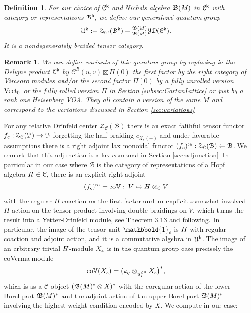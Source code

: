 \documentclass[a4paper, reqno]{amsart}
\newtheorem{definition}[theorem]{Definition}
\newtheorem{remark}[theorem]{Remark}
\theoremstyle{introTheorems}
\newcommand\cB{\mathcal{B}}
\newcommand\cC{\mathcal{C}}
\newcommand\cU{\mathcal{U}}
\newcommand\cZ{\mathcal{Z}}
\newcommand{\Vect}{\textup{Vect}}
\renewcommand{\1}{\mathbbold{1}}
\begin{document}
\begin{definition}
For our choice of $\cC^\k$ and Nichols algebra $\mathfrak{B}(M)$ in $\cC^\k$ with category or representations $\cB^\k$, we define our \emph{generalized quantum group}
\[\cU^\k:=\cZ_{\cC^\k}(\cB^\k)=\YD{\NicholsOf(M)}(\cC^\k).\]
It  is a nondegenerately braided tensor category.
\end{definition}
\begin{remark}
We can define variants of this quantum group by replacing in the Deligne product $\cC^\k$  by $\cC^R(u,v)\boxtimes \Pi(0)$ the first factor by the right category of Virasoro modules and/or the second factor $\Pi(0)$ by a fully unrolled version $\Vect_\h$ or the fully rolled version $\Pi$ in Section \ref{subsec:CartanLattice} or just by a rank one Heisenberg VOA. They all contain a version of the same $M$  and correspond to the variations discussed in Section \ref{sec:variations}
\end{remark}

For any relative Drinfeld center $\cZ_\cC(\cB)$ there is an exact faithful tensor functor $\forget_c:\cZ_\cC(\cB)\to \cB$ forgetting the half-braiding $c_{X,(-)}$ and under favorable assumptions there is a right adjoint lax monoidal functor $(\forget_c)^\ra:\cZ_\cC(\cB)\leftarrow \cB$. We remark that this adjunction is a lax comonad in Section \ref{sec:adjunction}. In particular in our case where $\cB$ is the category of representations of a Hopf algebra $\Nichols\in \cC$,  there is an explicit right adjoint 
$$(\forget_c)^\ra=\coLaugwitz:\;V\mapsto\Nichols\otimes_\cC V$$ 
with the regular $H$-coaction on the first factor and an explicit somewhat involved $H$-action on the tensor product involving double braidings on $V$, which turns the result into a Yetter-Drinfeld module, see  \cite{LW21} Theorem 3.13 and following. 
In particular, the image of the tensor unit $\1_\NicholsAlgebraCounit$ is $H$ with regular coaction and adjoint action, and it is a commutative algebra in $\cU^\k$. 
 The image of an arbitrary trivial $H$-module $X_\varepsilon$ is in the quantum group case precisely the coVerma module  
 $$\mathrm{co}\mathbb{V}(X_\varepsilon)
 =(u_q\otimes_{u_q^{\geq0}} X_\varepsilon\big)^*,$$
 which is as a $\cC$-object $(\mathfrak{B}(M)^*\otimes X)^*$ with the coregular action of the lower Borel part $\mathfrak{B}(M)^*$ and the adjoint action of the upper Borel part $\mathfrak{B}(M)^*$ involving the highest-weight condition encoded by $X$. We compute in our case:
\end{document}
